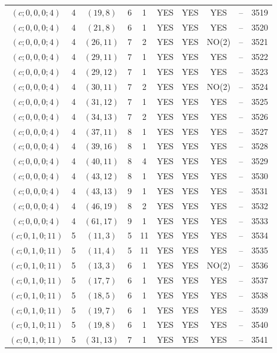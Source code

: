 \begin{longtable}{|c|c|c|c|c|c|c|c|c|c|}
$(c; 0, 0, 0; 4)$ & 4 & $(19, 8)$ & 6 & 1 & YES & YES & YES & -- & 3519\\
$(c; 0, 0, 0; 4)$ & 4 & $(21, 8)$ & 6 & 1 & YES & YES & YES & -- & 3520\\
$(c; 0, 0, 0; 4)$ & 4 & $(26, 11)$ & 7 & 2 & YES & YES & NO(2) & -- & 3521\\
$(c; 0, 0, 0; 4)$ & 4 & $(29, 11)$ & 7 & 1 & YES & YES & YES & -- & 3522\\
$(c; 0, 0, 0; 4)$ & 4 & $(29, 12)$ & 7 & 1 & YES & YES & YES & -- & 3523\\
$(c; 0, 0, 0; 4)$ & 4 & $(30, 11)$ & 7 & 2 & YES & YES & NO(2) & -- & 3524\\
$(c; 0, 0, 0; 4)$ & 4 & $(31, 12)$ & 7 & 1 & YES & YES & YES & -- & 3525\\
$(c; 0, 0, 0; 4)$ & 4 & $(34, 13)$ & 7 & 2 & YES & YES & YES & -- & 3526\\
$(c; 0, 0, 0; 4)$ & 4 & $(37, 11)$ & 8 & 1 & YES & YES & YES & -- & 3527\\
$(c; 0, 0, 0; 4)$ & 4 & $(39, 16)$ & 8 & 1 & YES & YES & YES & -- & 3528\\
$(c; 0, 0, 0; 4)$ & 4 & $(40, 11)$ & 8 & 4 & YES & YES & YES & -- & 3529\\
$(c; 0, 0, 0; 4)$ & 4 & $(43, 12)$ & 8 & 1 & YES & YES & YES & -- & 3530\\
$(c; 0, 0, 0; 4)$ & 4 & $(43, 13)$ & 9 & 1 & YES & YES & YES & -- & 3531\\
$(c; 0, 0, 0; 4)$ & 4 & $(46, 19)$ & 8 & 2 & YES & YES & YES & -- & 3532\\
$(c; 0, 0, 0; 4)$ & 4 & $(61, 17)$ & 9 & 1 & YES & YES & YES & -- & 3533\\
$(c; 0, 1, 0; 11)$ & 5 & $(11, 3)$ & 5 & 11 & YES & YES & YES & -- & 3534\\
$(c; 0, 1, 0; 11)$ & 5 & $(11, 4)$ & 5 & 11 & YES & YES & YES & -- & 3535\\
$(c; 0, 1, 0; 11)$ & 5 & $(13, 3)$ & 6 & 1 & YES & YES & NO(2) & -- & 3536\\
$(c; 0, 1, 0; 11)$ & 5 & $(17, 7)$ & 6 & 1 & YES & YES & YES & -- & 3537\\
$(c; 0, 1, 0; 11)$ & 5 & $(18, 5)$ & 6 & 1 & YES & YES & YES & -- & 3538\\
$(c; 0, 1, 0; 11)$ & 5 & $(19, 7)$ & 6 & 1 & YES & YES & YES & -- & 3539\\
$(c; 0, 1, 0; 11)$ & 5 & $(19, 8)$ & 6 & 1 & YES & YES & YES & -- & 3540\\
$(c; 0, 1, 0; 11)$ & 5 & $(31, 13)$ & 7 & 1 & YES & YES & YES & -- & 3541\\

\end{longtable}
